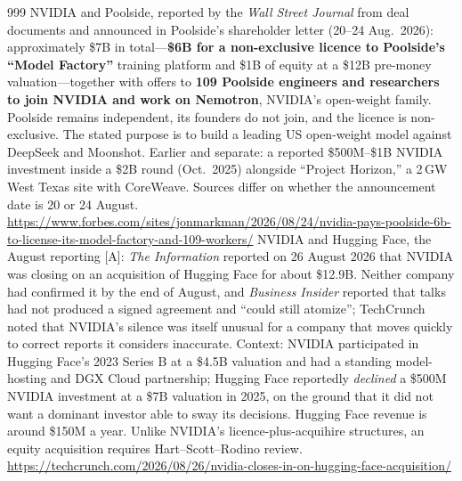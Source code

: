 \begin{thebibliography}{999}
 NVIDIA and Poolside, reported by the \emph{Wall Street Journal} from deal documents and announced in Poolside's shareholder letter (20--24 Aug.\ 2026): approximately \$7B in total---\textbf{\$6B for a non-exclusive licence to Poolside's ``Model Factory''} training platform and \$1B of equity at a \$12B pre-money valuation---together with offers to \textbf{109 Poolside engineers and researchers to join NVIDIA and work on Nemotron}, NVIDIA's open-weight family. Poolside remains independent, its founders do not join, and the licence is non-exclusive. The stated purpose is to build a leading US open-weight model against DeepSeek and Moonshot. Earlier and separate: a reported \$500M--\$1B NVIDIA investment inside a \$2B round (Oct.\ 2025) alongside ``Project Horizon,'' a 2\,GW West Texas site with CoreWeave. Sources differ on whether the announcement date is 20 or 24 August. \url{https://www.forbes.com/sites/jonmarkman/2026/08/24/nvidia-pays-poolside-6b-to-license-its-model-factory-and-109-workers/}
 NVIDIA and Hugging Face, the August reporting [A]: \emph{The Information} reported on 26 August 2026 that NVIDIA was closing on an acquisition of Hugging Face for about \$12.9B. Neither company had confirmed it by the end of August, and \emph{Business Insider} reported that talks had not produced a signed agreement and ``could still atomize''; TechCrunch noted that NVIDIA's silence was itself unusual for a company that moves quickly to correct reports it considers inaccurate. Context: NVIDIA participated in Hugging Face's 2023 Series B at a \$4.5B valuation and had a standing model-hosting and DGX Cloud partnership; Hugging Face reportedly \emph{declined} a \$500M NVIDIA investment at a \$7B valuation in 2025, on the ground that it did not want a dominant investor able to sway its decisions. Hugging Face revenue is around \$150M a year. Unlike NVIDIA's licence-plus-acquihire structures, an equity acquisition requires Hart--Scott--Rodino review. \url{https://techcrunch.com/2026/08/26/nvidia-closes-in-on-hugging-face-acquisition/}


\end{thebibliography}

